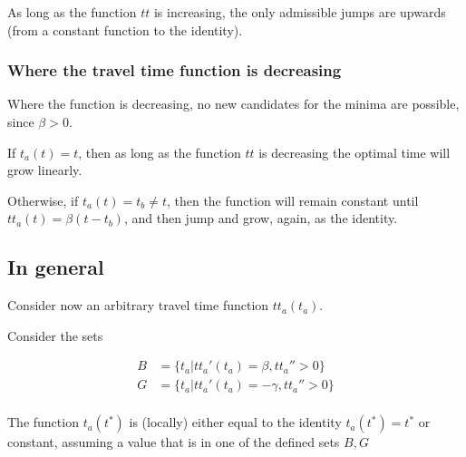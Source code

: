 \documentclass{article}
\begin{document}
As long as the function \(tt\) is increasing, the only admissible jumps are upwards (from a constant function to the identity).

\subsubsection{Where the travel time function is decreasing}

Where the function is decreasing, no new candidates for the minima are possible, since \(\beta > 0\).

If \(t_a(t) = t\), then as long as the function \(tt\) is decreasing the optimal time will grow linearly.

Otherwise, if \(t_a(t) = t_b \neq t\), then the function will remain constant until \(tt_a(t) = \beta (t - t_b)\),
and then jump and grow, again, as the identity.

\subsection{In general}

Consider now an arbitrary travel time function \(tt_a(t_a)\).

Consider the sets

\begin{align*}
  B & = \{t_a | tt_a'(t_a) = \beta, tt_a'' > 0\} \\
  G & = \{t_a | tt_a'(t_a) = -\gamma, tt_a'' > 0\} \\
\end{align*}

The function \(t_a(t^*)\) is (locally) either equal to the identity \(t_a(t^*) = t^*\) or constant, assuming a value that is in one of the defined sets \(B, G\)
\end{document}
